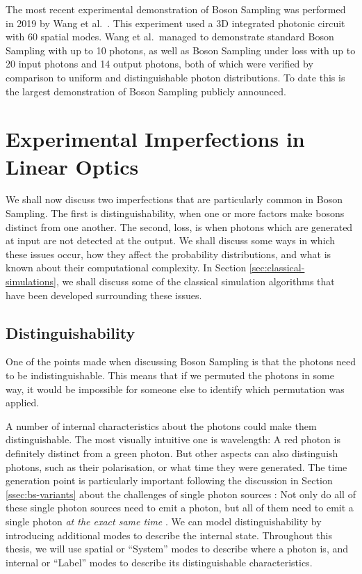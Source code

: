 The most recent experimental demonstration of Boson Sampling was performed in 2019 by Wang et al.~\cite{wang2019}. This experiment used a 3D integrated photonic circuit with 60 spatial modes. Wang et al.\ managed to demonstrate standard Boson Sampling with up to 10 photons, as well as Boson Sampling under loss with up to 20 input photons and 14 output photons, both of which were verified by comparison to uniform and distinguishable photon distributions. To date this is the largest demonstration of Boson Sampling publicly announced.

\section{Experimental Imperfections in Linear Optics}
\label{sec:lo-imperfections}

We shall now discuss two imperfections that are particularly common in Boson Sampling. The first is distinguishability, when one or more factors make bosons distinct from one another. The second, loss, is when photons which are generated at input are not detected at the output. We shall discuss some ways in which these issues occur, how they affect the probability distributions, and what is known about their computational complexity. In Section \ref{sec:classical-simulations}, we shall discuss some of the classical simulation algorithms that have been developed surrounding these issues.

\subsection{Distinguishability}
\label{ssec:imperfections-distinguishability}

One of the points made when discussing Boson Sampling is that the photons need to be indistinguishable. This means that if we permuted the photons in some way, it would be impossible for someone else to identify which permutation was applied.

A number of internal characteristics about the photons could make them distinguishable. The most visually intuitive one is wavelength: A red photon is definitely distinct from a green photon. But other aspects can also distinguish photons, such as their polarisation, or what time they were generated. The time generation point is particularly important following the discussion in Section \ref{ssec:bs-variants} about the challenges of single photon sources \cite{eisaman2011}: Not only do all of these single photon sources need to emit a photon, but all of them need to emit a single photon \textit{at the exact same time} \cite{aaronson2010report}. We can model distinguishability by introducing additional modes to describe the internal state. Throughout this thesis, we will use spatial or ``System'' modes to describe where a photon is, and internal or ``Label'' modes to describe its distinguishable characteristics.

